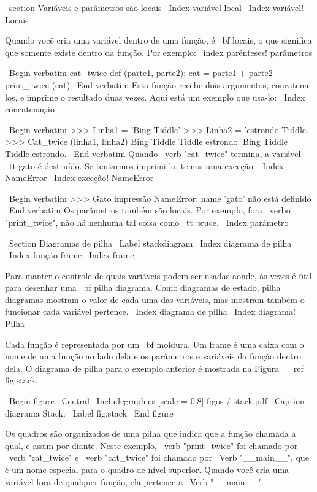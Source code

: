 \documentclass[10pt]{book}
\begin{document}
{\ section {Variáveis ​​e parâmetros são locais}
\ Index {variável local}
\ Index {variável! Locais}

Quando você cria uma variável dentro de uma função, é {\ bf locais},
o que significa que somente
existe dentro da função. Por exemplo:
\ index {parênteses! parâmetros}

\ Begin {verbatim}
cat_twice def (parte1, parte2):
    cat = parte1 + parte2
    print_twice (cat)
\ End {verbatim}
%
Esta função recebe dois argumentos, concatena-los, e imprime
o resultado duas vezes. Aqui está um exemplo que usa-lo:
\ Index {concatenação}

\ Begin {verbatim}
>>> Linha1 = 'Bing Tiddle'
>>> Linha2 = 'estrondo Tiddle.
>>> Cat_twice (linha1, linha2)
Bing Tiddle Tiddle estrondo.
Bing Tiddle Tiddle estrondo.
\ End {verbatim}
%
Quando \ verb "cat_twice" termina, a variável {\ tt gato}
é destruído. Se tentarmos imprimi-lo, temos uma exceção:
\ Index {} NameError
\ Index {exceção! NameError}

\ Begin {verbatim}
>>> Gato impressão
NameError: name 'gato' não está definido
\ End {verbatim}
%
Os parâmetros também são locais.
Por exemplo, fora \ verbo "print_twice", não há nenhuma
tal coisa como {\ tt bruce}.
\ Index {parâmetro}


\ Section {Diagramas de pilha}
\ Label {} stackdiagram
\ Index {diagrama de pilha}
\ Index {função frame}
\ Index {frame}

Para manter o controle de quais variáveis ​​podem ser usadas aonde, às vezes é
útil para desenhar uma {\ bf pilha diagrama}. Como diagramas de estado, pilha
diagramas mostram o valor de cada uma das variáveis, mas mostram também o
funcionar cada variável pertence.
\ Index {diagrama de pilha}
\ Index {diagrama! Pilha}

Cada função é representada por um {\ bf moldura}. Um frame é uma caixa
com o nome de uma função
ao lado dela e os parâmetros e variáveis ​​da função dentro dela.
O diagrama de pilha para o
exemplo anterior é mostrada na Figura ~ \ ref {fig.stack}.

\ Begin {figure}
\ Central
{\ Includegraphics [scale = 0.8] {figos / stack.pdf}}
\ Caption {diagrama Stack.}
\ Label {} fig.stack
\ End {figure}


Os quadros são organizados de uma pilha que indica que a função
chamada a qual, e assim por diante. Neste exemplo, \ verb "print_twice"
foi chamado por \ verb "cat_twice" e \ verb "cat_twice" foi chamado por 
\ Verb "__main__", que é um nome especial para o quadro de nível superior. Quando
você cria uma variável fora de qualquer função, ela pertence a 
\ Verb "__main__".

}
\end{document}
